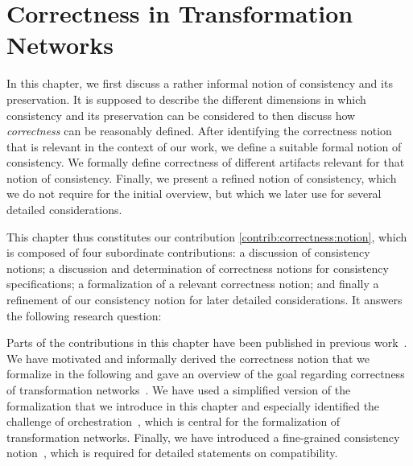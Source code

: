 \chapter{Correctness in Transformation Networks
}
\label{chap:correctness}

In this chapter, we first discuss a rather informal notion of consistency and its preservation. It is supposed to describe the different dimensions in which consistency and its preservation can be considered to then discuss how \emph{correctness} can be reasonably defined.
After identifying the correctness notion that is relevant in the context of our work, we define a suitable formal notion of consistency.
We formally define correctness of different artifacts relevant for that notion of consistency.
Finally, we present a refined notion of consistency, which we do not require for the initial overview, but which we later use for several detailed considerations.

This chapter thus constitutes our contribution \autoref{contrib:correctness:notion}, which is composed of four subordinate contributions: a discussion of consistency notions; a discussion and determination of correctness notions for consistency specifications; a formalization of a relevant correctness notion; and finally a refinement of our consistency notion for later detailed considerations.
It answers the following research question:


Parts of the contributions in this chapter have been published in previous work~.
We have motivated and informally derived the correctness notion that we formalize in the following and gave an overview of the goal regarding correctness of transformation networks~.
We have used a simplified version of the formalization that we introduce in this chapter and especially identified the challenge of orchestration~, which is central for the formalization of transformation networks.
Finally, we have introduced a fine-grained consistency notion~, which is required for detailed statements on compatibility.






